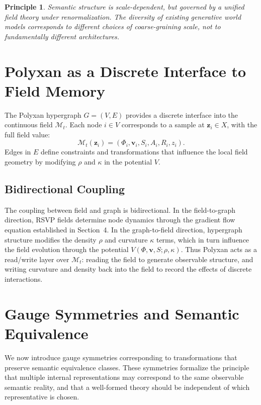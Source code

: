 \documentclass[11pt]{article}
\newtheorem{principle}{Principle}
\begin{document}
\begin{principle}
Semantic structure is scale-dependent, but governed by a unified field
theory under renormalization.
The diversity of existing generative world models corresponds to different
choices of coarse-graining scale, not to fundamentally different
architectures.
\end{principle}

\section{Polyxan as a Discrete Interface to Field Memory}

The Polyxan hypergraph $G=(V,E)$ provides a discrete interface into the
continuous field $\mathcal{M}_t$.
Each node $i \in V$ corresponds to a sample at $\mathbf{z}_i \in X$, with
the full field value:
\[
\mathcal{M}_t(\mathbf{z}_i)
=
(\Phi_i, \mathbf{v}_i, S_i, A_i, R_i, z_i).
\]
Edges in $E$ define constraints and transformations that influence the
local field geometry by modifying $\rho$ and $\kappa$ in the potential $V$.

\subsection{Bidirectional Coupling}

The coupling between field and graph is bidirectional.
In the field-to-graph direction, RSVP fields determine node dynamics through
the gradient flow equation established in Section~4.
In the graph-to-field direction, hypergraph structure modifies the density
$\rho$ and curvature $\kappa$ terms, which in turn influence the field
evolution through the potential $V(\Phi,\mathbf{v},S;\rho,\kappa)$.
Thus Polyxan acts as a read/write layer over $\mathcal{M}_t$: reading the
field to generate observable structure, and writing curvature and density
back into the field to record the effects of discrete interactions.

\section{Gauge Symmetries and Semantic Equivalence}

We now introduce gauge symmetries corresponding to transformations that
preserve semantic equivalence classes.
These symmetries formalize the principle that multiple internal
representations may correspond to the same observable semantic reality,
and that a well-formed theory should be independent of which representative
is chosen.
\end{document}
